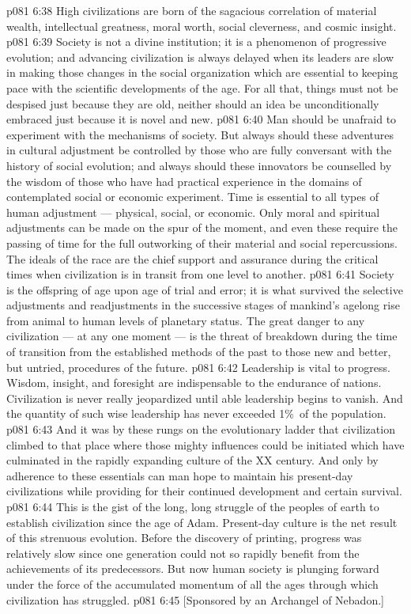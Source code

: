 \vs p081 6:38 High civilizations are born of the sagacious correlation of material wealth, intellectual greatness, moral worth, social cleverness, and cosmic insight.
\vs p081 6:39 \bibnobreakspace {} Society is not a divine institution; it is a phenomenon of progressive evolution; and advancing civilization is always delayed when its leaders are slow in making those changes in the social organization which are essential to keeping pace with the scientific developments of the age. For all that, things must not be despised just because they are old, neither should an idea be unconditionally embraced just because it is novel and new.
\vs p081 6:40 Man should be unafraid to experiment with the mechanisms of society. But always should these adventures in cultural adjustment be controlled by those who are fully conversant with the history of social evolution; and always should these innovators be counselled by the wisdom of those who have had practical experience in the domains of contemplated social or economic experiment.  Time is essential to all types of human adjustment --- physical, social, or economic. Only moral and spiritual adjustments can be made on the spur of the moment, and even these require the passing of time for the full outworking of their material and social repercussions. The ideals of the race are the chief support and assurance during the critical times when civilization is in transit from one level to another.
\vs p081 6:41 \bibnobreakspace {} Society is the offspring of age upon age of trial and error; it is what survived the selective adjustments and readjustments in the successive stages of mankind’s agelong rise from animal to human levels of planetary status. The great danger to any civilization --- at any one moment --- is the threat of breakdown during the time of transition from the established methods of the past to those new and better, but untried, procedures of the future.
\vs p081 6:42 Leadership is vital to progress. Wisdom, insight, and foresight are indispensable to the endurance of nations. Civilization is never really jeopardized until able leadership begins to vanish. And the quantity of such wise leadership has never exceeded 1\%\ of the population.
\vs p081 6:43 And it was by these rungs on the evolutionary ladder that civilization climbed to that place where those mighty influences could be initiated which have culminated in the rapidly expanding culture of the XX century. And only by adherence to these essentials can man hope to maintain his present\hyp{}day civilizations while providing for their continued development and certain survival.
\vs p081 6:44 \pc This is the gist of the long, long struggle of the peoples of earth to establish civilization since the age of Adam. Present\hyp{}day culture is the net result of this strenuous evolution. Before the discovery of printing, progress was relatively slow since one generation could not so rapidly benefit from the achievements of its predecessors. But now human society is plunging forward under the force of the accumulated momentum of all the ages through which civilization has struggled.
\vsetoff
\vs p081 6:45 [Sponsored by an Archangel of Nebadon.]
\quizlink
